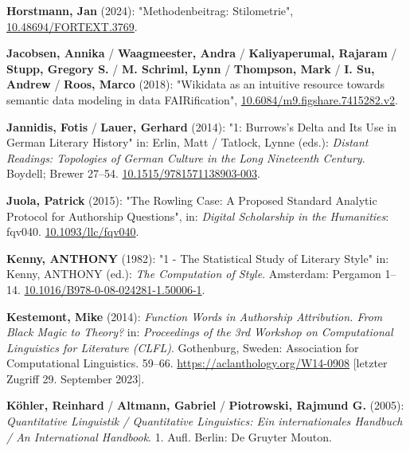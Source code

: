 \documentclass[
  12pt,
  letterpaper,
  DIV=11,
  numbers=noendperiod]{scrreprt}
\newlength{\cslhangindent}
\newenvironment{CSLReferences}[2] %
 {\begin{list}{}{%
  \setlength{\itemindent}{0pt}
  \setlength{\leftmargin}{0pt}
  \setlength{\parsep}{0pt}
  \ifodd #1
   \setlength{\leftmargin}{\cslhangindent}
   \setlength{\itemindent}{-1\cslhangindent}
  \fi
  \setlength{\itemsep}{#2\baselineskip}}}
 {\end{list}}
\begin{document}
\begin{CSLReferences}{1}{0}
\textbf{Horstmann, Jan} (2024): "Methodenbeitrag: {Stilometrie}",
\href{https://doi.org/10.48694/FORTEXT.3769}{10.48694/FORTEXT.3769}.

\textbf{Jacobsen, Annika} / \textbf{Waagmeester, Andra} /
\textbf{Kaliyaperumal, Rajaram} / \textbf{Stupp, Gregory S.} /
\textbf{M. Schriml, Lynn} / \textbf{Thompson, Mark} / \textbf{I. Su,
Andrew} / \textbf{Roos, Marco} (2018): "Wikidata as an intuitive
resource towards semantic data modeling in data {FAIRification}",
\href{https://doi.org/10.6084/m9.figshare.7415282.v2}{10.6084/m9.figshare.7415282.v2}.

\textbf{Jannidis, Fotis} / \textbf{Lauer, Gerhard} (2014): "1:
{Burrows}'s {Delta} and {Its} {Use} in {German} {Literary} {History}"
in: Erlin, Matt / Tatlock, Lynne (eds.): \emph{Distant {Readings}:
{Topologies} of {German} {Culture} in the {Long} {Nineteenth}
{Century}}. Boydell; Brewer 27--54.
\href{https://doi.org/10.1515/9781571138903-003}{10.1515/9781571138903-003}.

\textbf{Juola, Patrick} (2015): "The {Rowling} {Case}: {A} {Proposed}
{Standard} {Analytic} {Protocol} for {Authorship} {Questions}", in:
\emph{Digital Scholarship in the Humanities}: fqv040.
\href{https://doi.org/10.1093/llc/fqv040}{10.1093/llc/fqv040}.

\textbf{Kenny, ANTHONY} (1982): "1 - {The} {Statistical} {Study} of
{Literary} {Style}" in: Kenny, ANTHONY (ed.): \emph{The {Computation} of
{Style}}. Amsterdam: Pergamon 1--14.
\href{https://doi.org/10.1016/B978-0-08-024281-1.50006-1}{10.1016/B978-0-08-024281-1.50006-1}.

\textbf{Kestemont, Mike} (2014): \emph{Function {Words} in {Authorship}
{Attribution}. {From} {Black} {Magic} to {Theory}?} in:
\emph{Proceedings of the 3rd {Workshop} on {Computational} {Linguistics}
for {Literature} ({CLFL})}. Gothenburg, Sweden: Association for
Computational Linguistics. 59--66.
\url{https://aclanthology.org/W14-0908} {[}letzter Zugriff 29. September
2023{]}.

\textbf{Köhler, Reinhard} / \textbf{Altmann, Gabriel} /
\textbf{Piotrowski, Rajmund G.} (2005): \emph{Quantitative {Linguistik}
/ {Quantitative} {Linguistics}: {Ein} internationales {Handbuch} / {An}
{International} {Handbook}}. 1. Aufl. Berlin: De Gruyter Mouton.


\end{CSLReferences}
\end{document}
